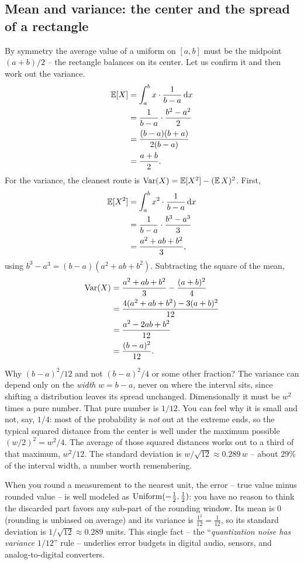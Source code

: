 \subsection{Mean and variance: the center and the spread of a rectangle}
By symmetry the average value of a uniform on $[a,b]$ must be the midpoint
$(a+b)/2$ -- the rectangle balances on its center. Let us confirm it and then
work out the variance.
\begin{align*}
  \operatorname{\mathbb{E}}[X] &= \int_a^b x\cdot\frac{1}{b-a}\,\mathrm{d} x \\
        &= \frac{1}{b-a}\cdot\frac{b^2-a^2}{2} \\
        &= \frac{(b-a)(b+a)}{2(b-a)} \\
        &= \frac{a+b}{2}.
\end{align*}
For the variance, the cleanest route is $\operatorname{Var}(X) = \operatorname{\mathbb{E}}[X^2] - (\operatorname{\mathbb{E}} X)^2$. First,
\begin{align*}
  \operatorname{\mathbb{E}}[X^2] &= \int_a^b x^2\cdot\frac{1}{b-a}\,\mathrm{d} x \\
          &= \frac{1}{b-a}\cdot\frac{b^3-a^3}{3} \\
          &= \frac{a^2+ab+b^2}{3},
\end{align*}
using $b^3-a^3 = (b-a)(a^2+ab+b^2)$. Subtracting the square of the mean,
\begin{align*}
  \operatorname{Var}(X) &= \frac{a^2+ab+b^2}{3} - \frac{(a+b)^2}{4} \\
          &= \frac{4(a^2+ab+b^2) - 3(a+b)^2}{12} \\
          &= \frac{a^2 - 2ab + b^2}{12} \\
          &= \frac{(b-a)^2}{12}.
\end{align*}
\begin{whybox}
Why $(b-a)^2/12$ and not $(b-a)^2/4$ or some other fraction? The variance can
depend only on the \emph{width} $w=b-a$, never on where the interval sits, since
shifting a distribution leaves its spread unchanged. Dimensionally it must be
$w^2$ times a pure number. That pure number is $1/12$. You can feel why it is
small and not, say, $1/4$: most of the probability is \emph{not} out at the
extreme ends, so the typical squared distance from the center is well under the
maximum possible $(w/2)^2 = w^2/4$. The average of those squared
distances works out to a third of that maximum, $w^2/12$. The standard
deviation is $w/\sqrt{12} \approx 0.289\,w$ -- about $29\%$ of the interval
width, a number worth remembering.
\end{whybox}
\begin{example}
\label{ch11:ex-rounding}
When you round a measurement to the nearest unit, the error -- true value minus
rounded value -- is well modeled as $\operatorname{Uniform}(-\tfrac12,\tfrac12)$: you have no
reason to think the discarded part favors any sub-part of the rounding window.
Its mean is $0$ (rounding is unbiased on average) and its variance is
$\frac{1^2}{12} = \frac{1}{12}$, so its standard deviation is
$1/\sqrt{12} \approx 0.289$ units. This single fact -- the
``\emph{quantization noise has variance $1/12$}'' rule -- underlies error
budgets in digital audio, sensors, and analog-to-digital converters.
\end{example}

